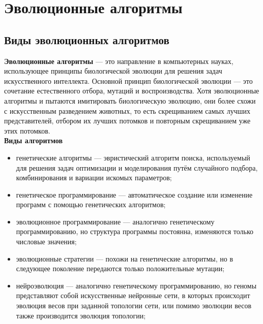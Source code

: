 \newpage

\chapter{Эволюционные алгоритмы}
\section{Виды эволюционных алгоритмов}

\textbf{Эволюционные алгоритмы} — это направление в компьютерных науках, использующее принципы биологической эволюции для решения задач искусственного интеллекта. Основной принцип биологической эволюции — это сочетание естественного отбора, мутаций и воспроизводства. Хотя эволюционные алгоритмы и пытаются имитировать биологическую эволюцию, они более схожи с искусственным разведением животных, то есть скрещиванием самых лучших представителей, отбором их лучших потомков и повторным скрещиванием уже этих потомков. \\

\textbf{Виды алгоритмов}

\begin{itemize}
  \item генетические алгоритмы — эвристический алгоритм поиска, используемый для решения задач оптимизации и моделирования путём случайного подбора, комбинирования и вариации искомых параметров;
  \item генетическое программирование — автоматическое создание или изменение программ с помощью генетических алгоритмов;
  \item эволюционное программирование — аналогично генетическому программированию, но структура программы постоянна, изменяются только числовые значения;
  \item эволюционные стратегии — похожи на генетические алгоритмы, но в следующее поколение передаются только положительные мутации;
  \item нейроэволюция — аналогично генетическому программированию, но геномы представляют собой искусственные нейронные сети, в которых происходит эволюция весов при заданной топологии сети, или помимо эволюции весов также производится эволюция топологии;
\end{itemize}

